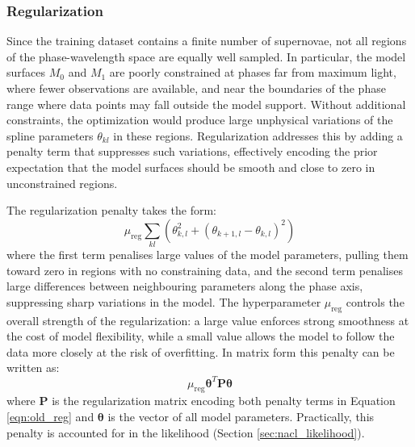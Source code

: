 \subsubsection{Regularization}

Since the training dataset contains a finite number of supernovae, not 
all regions of the phase-wavelength space are equally well sampled. In 
particular, the model surfaces $M_0$ and $M_1$ are poorly constrained 
at phases far from maximum light, where fewer observations are available, 
and near the boundaries of the phase range where data points may fall 
outside the model support. Without additional constraints, the 
optimization would produce large unphysical variations of the spline 
parameters $\theta_{kl}$ in these regions. Regularization addresses 
this by adding a penalty term that suppresses such 
variations, effectively encoding the prior expectation that the model 
surfaces should be smooth and close to zero in unconstrained regions.

The regularization penalty takes the form:
\begin{equation}
    \mu_{\text{reg}} \sum_{kl} \left( \theta_{k,l}^2 + 
    \left( \theta_{k+1,l} - \theta_{k,l} \right)^2 \right)
    \label{eqn:old_reg}
\end{equation}
where the first term penalises large values of the model parameters, 
pulling them toward zero in regions with no constraining data, and the 
second term penalises large differences between neighbouring parameters 
along the phase axis, suppressing sharp variations in the model. The 
hyperparameter $\mu_{\text{reg}}$ controls the overall strength of the 
regularization: a large value enforces strong smoothness at the cost 
of model flexibility, while a small value allows the model to follow 
the data more closely at the risk of overfitting. 
In matrix form this 
penalty can be written as:
\begin{equation}
    \mu_{\text{reg}} \boldsymbol{\theta}^T 
    \mathbf{P} \boldsymbol{\theta}
    \label{eqn:chi2_reg_old}
\end{equation}
where $\mathbf{P}$ is the regularization matrix encoding both penalty 
terms in Equation \ref{eqn:old_reg} and $\boldsymbol{\theta}$ is the 
vector of all model parameters.
Practically, this penalty is accounted for in the likelihood (Section \ref{sec:nacl_likelihood}).

